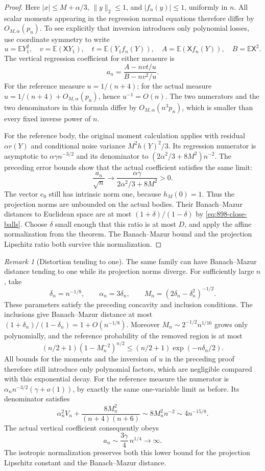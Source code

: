 \documentclass[11pt,a4paper]{article}
\theoremstyle{remark}
\newtheorem{remark}[theorem]{Remark}
\begin{document}
\begin{proof}
Here $|x|\leq M+\alpha/3$, $\|y\|_2\leq1$, and $|f_n(y)|\leq1$,
uniformly in $n$.  All scalar moments appearing in the regression
normal equations therefore differ by $O_{M,\alpha}(p_n)$.
To see explicitly that inversion introduces only polynomial losses,
use coordinate symmetry to write
\[
 u=\mathbb EY_1^2,\quad v=\mathbb E(\mathsf XY_1),\quad
 t=\mathbb E(Y_1f_n(Y)),\quad
 A=\mathbb E(\mathsf Xf_n(Y)),\quad B=\mathbb E\mathsf X^2.
\]
The vertical regression coefficient for either measure is
\[
 a_n=\frac{A-nvt/u}{B-nv^2/u}.
\]
For the reference measure $u=1/(n+4)$; for the actual measure
$u=1/(n+4)+O_{M,\alpha}(p_n)$, hence $u^{-1}=O(n)$.
The two numerators and the two denominators in this formula differ by
$O_{M,\alpha}(n^3p_n)$, which is smaller than every fixed inverse power
of $n$.

For the reference body, the original moment calculation applies with
residual $\alpha r(Y)$ and conditional noise variance
$M^2h(Y)^2/3$.  Its regression numerator is asymptotic to
$\alpha\gamma n^{-3/2}$ and its denominator to
$(2\alpha^2/3+8M^2)n^{-2}$.  The preceding error bounds show that the
actual coefficient satisfies the same limit:
\[
 \frac{a_n}{\sqrt n}\longrightarrow
 \frac{\alpha\gamma}{2\alpha^2/3+8M^2}>0.
\]
The vector $e_0$ still has intrinsic norm one, because
$h_M(0)=1$.  Thus the projection norms are unbounded on the actual
bodies.  Their Banach--Mazur distances to Euclidean space are at most
$(1+\delta)/(1-\delta)$ by \eqref{eq:898-close-balls}.
Choose $\delta$ small enough that this ratio is at most $D$, and apply
the affine normalization from the theorem.  The Banach--Mazur bound and
the projection Lipschitz ratio both survive this normalization.
\end{proof}

\begin{remark}[Distortion tending to one]
The same family can have Banach--Mazur distance tending to one while its
projection norms diverge.  For sufficiently large $n$, take
\[
 \delta_n=n^{-1/8},\qquad \alpha_n=3\delta_n,\qquad
 M_n=(2\delta_n-\delta_n^2)^{-1/2}.
\]
These parameters satisfy the preceding concavity and inclusion conditions.
The inclusions give Banach--Mazur distance at most
$(1+\delta_n)/(1-\delta_n)=1+O(n^{-1/8})$.
Moreover $M_n\sim 2^{-1/2}n^{1/16}$ grows only polynomially, and the
reference probability of the removed region is at most
\[
 (n/2+1)(1-M_n^{-2})^{n/2}
 \leq(n/2+1)\exp(-n\delta_n/2).
\]
All bounds for the moments and the inversion of $u$ in the preceding
proof therefore still introduce only polynomial factors, which are
negligible compared with this exponential decay.  For the reference
measure the numerator is
$\alpha_n n^{-3/2}(\gamma+o(1))$, by exactly the same one-variable
limit as before.  Its denominator satisfies
\[
 \alpha_n^2V_n+\frac{8M_n^2}{(n+4)(n+6)}
 \sim 8M_n^2 n^{-2}\sim4n^{-15/8}.
\]
The actual vertical coefficient consequently obeys
\[
 a_n\sim\frac{3\gamma}{4}\,n^{1/4}\longrightarrow\infty.
\]
The isotropic normalization preserves both this lower bound for the
projection Lipschitz constant and the Banach--Mazur distance.
\end{remark}
\end{document}
